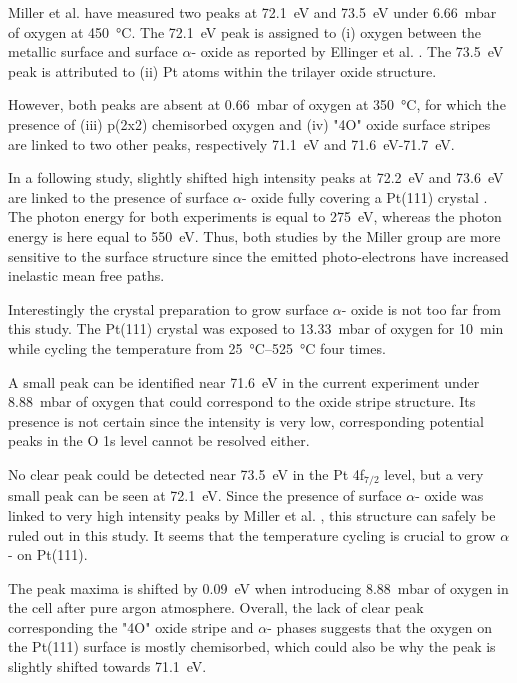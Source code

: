 Miller et al. \parencite*{Miller2011} have measured two peaks at \qty{72.1}{\eV} and \qty{73.5}{\eV} under \qty{6.66}{\milli\bar} of oxygen at \qty{450}{\degreeCelsius}.
The \qty{72.1}{\eV} peak is assigned to (i) oxygen between the metallic surface and surface $\alpha$- oxide as reported by Ellinger et al. \parencite*{Ellinger2008}.
The \qty{73.5}{\eV} peak is attributed to (ii) Pt atoms within the trilayer oxide structure.

However, both peaks are absent at \qty{0.66}{\milli\bar} of oxygen at \qty{350}{\degreeCelsius}, for which the presence of (iii) p(2x2) chemisorbed oxygen and (iv) "4O" oxide surface stripes are linked to two other peaks, respectively \qty{71.1}{\eV} and \qty{71.6}{\eV}-\qty{71.7}{\eV}.

In a following study, slightly shifted high intensity peaks at \qty{72.2}{\eV} and \qty{73.6}{\eV} are linked to the presence of surface $\alpha$- oxide fully covering a Pt(111) crystal \parencite{Miller2014}.
The photon energy for both experiments is equal to \qty{275}{\eV}, whereas the photon energy is here equal to \qty{550}{\eV}.
Thus, both studies by the Miller group are more sensitive to the surface structure since the emitted photo-electrons have increased inelastic mean free paths.

Interestingly the crystal preparation to grow surface $\alpha$- oxide is not too far from this study.
The Pt(111) crystal was exposed to \qty{13.33}{\milli\bar} of oxygen for \qty{10}{\minute} while cycling the temperature from \qtyrange{25}{525}{\degreeCelsius} four times.

A small peak can be identified near \qty{71.6}{\eV} in the current experiment under \qty{8.88}{\milli\bar} of oxygen that could correspond to the oxide stripe structure.
Its presence is not certain since the intensity is very low, corresponding potential peaks in the O 1s level cannot be resolved either.

No clear peak could be detected near \qty{73.5}{\eV} in the Pt 4f$_{7/2}$ level, but a very small peak can be seen at \qty{72.1}{\eV}.
Since the presence of surface $\alpha$- oxide was linked to very high intensity peaks by Miller et al. \parencite{Miller2014}, this structure can safely be ruled out in this study.
It seems that the temperature cycling is crucial to grow $\alpha$- on Pt(111).

The peak maxima is shifted by \qty{0.09}{\eV} when introducing \qty{8.88}{\milli\bar} of oxygen in the cell after pure argon atmosphere.
Overall, the lack of clear peak corresponding the "4O" oxide stripe and $\alpha$- phases suggests that the oxygen on the Pt(111) surface is mostly chemisorbed, which could also be why the peak is slightly shifted towards \qty{71.1}{\eV}.

